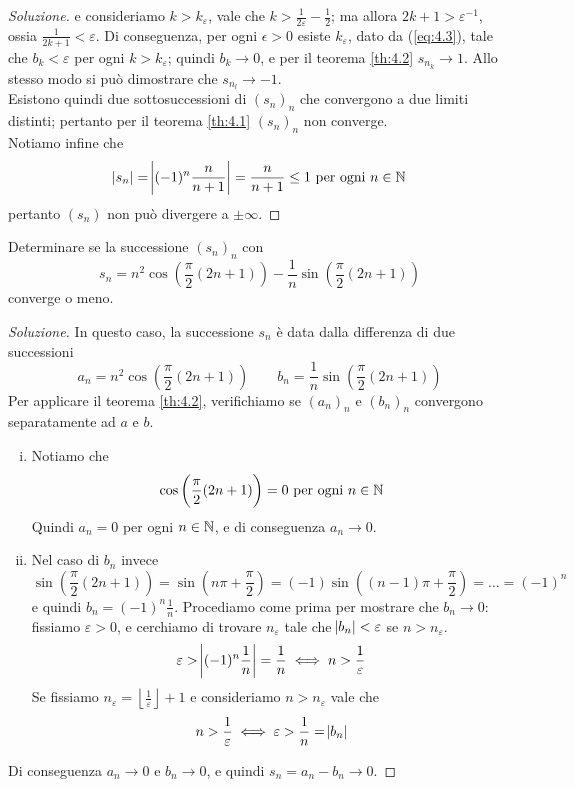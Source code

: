 \begin{proof}[Soluzione]
    e consideriamo $k>k_\varepsilon$, vale che $k>\frac{1}{2\varepsilon}-\frac{1}{2}$; ma allora $2k+1 >{\varepsilon}^{-1}$, ossia $\frac{1}{2k+1}<\varepsilon$. Di conseguenza, per ogni $\epsilon>0$ esiste $k_\varepsilon$, dato da (\ref{eq:4.3}), tale che $b_k<\varepsilon$ per ogni $k>k_\varepsilon$; quindi $b_k\to 0$, e per il teorema \ref{th:4.2} $s_{n_k}\to 1$. Allo stesso modo si può dimostrare che $s_{n_l}\to -1$.\\
    Esistono quindi due sottosuccessioni di $(s_n)_n$ che convergono a due limiti distinti; pertanto per il teorema \ref{th:4.1} $(s_n)_n$ non converge.\\
    Notiamo infine che 
    \[
    \abs{s_n} = \abs{(-1)^n \frac{n}{n+1}} = \frac{n}{n+1}\le 1 \ \text{per ogni} \ n\in\amsbb{N}
    \]
    pertanto $(s_n)$ non può divergere a $\pm \infty$.
\end{proof}
\begin{exercise}
    \label{ex:4.2}
    Determinare se la successione $(s_n)_n$ con
    \[
    s_n = n^2\cos\left(\frac{\pi}{2}(2n+1)\right)-\frac{1}{n}\sin\left(\frac{\pi}{2}(2n+1)\right)
    \]
    converge o meno.
\end{exercise}
\begin{proof}[Soluzione]
    In questo caso, la successione $s_n$ è data dalla differenza di due successioni 
    \[
    {a_n = n^2 \cos\left(\frac{\pi}{2}(2n+1)\right)}\qquad {b_n = \frac{1}{n}\sin\left(\frac{\pi}{2}(2n+1)\right)}
    \]
    Per applicare il teorema \ref{th:4.2}, verifichiamo se $(a_n)_n$ e $(b_n)_n$ convergono separatamente ad $a$ e $b$.
    \begin{enumerate}[(i)]
        \item Notiamo che 
        \[
        \cos\left(\frac{\pi}{2}(2n+1)\right) = 0 \ \text{per ogni} \ n\in\amsbb{N}
        \]
        Quindi $a_n = 0$ per ogni $n\in\amsbb{N}$, e di conseguenza $a_n \to 0$.
        \item Nel caso di $b_n$ invece
        \[
            \sin\left(\frac{\pi}{2}(2n+1)\right) = \sin\left(n\pi + \frac{\pi}{2}\right) = (-1)\sin\left((n-1)\pi + \frac{\pi}{2}\right) = \dots = (-1)^n
        \]
        e quindi $b_n = (-1)^n \frac{1}{n}$. Procediamo come prima per mostrare che $b_n\to 0$: fissiamo $\varepsilon>0$, e cerchiamo di trovare $n_\varepsilon$ tale che $\abs{b_n}<\varepsilon $ se $n>n_\varepsilon$.
        \[
        \varepsilon> \abs{(-1)^n\frac{1}{n}} = \frac{1}{n} \iff n > \frac{1}{\varepsilon}
        \]
        Se fissiamo $n_\varepsilon = \left \lfloor \frac{1}{\varepsilon} \right \rfloor+1$ e consideriamo $n>n_\varepsilon$ vale che 
        \[
        n>\frac{1}{\varepsilon} \iff \varepsilon>\frac{1}{n} = \abs{b_n}
        \]
    \end{enumerate}
    Di conseguenza $a_n \to 0 $ e $b_n \to 0$, e quindi $s_n = a_n - b_n \to 0$.
\end{proof}
